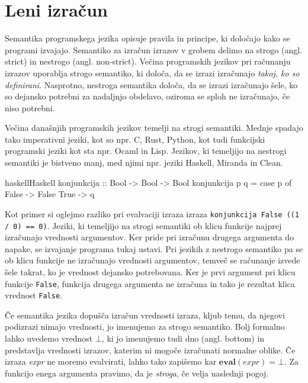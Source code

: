 \section{Leni izračun}
\label{sec:leni-izracun}

Semantika programskega jezika opisuje pravila in principe, ki določajo kako se programi izvajajo. Semantiko za izračun izrazov v grobem delimo na strogo (angl. strict) in nestrogo (angl. non-strict). Večina programskih jezikov pri računanju izrazov uporablja strogo semantiko, ki določa, da se izrazi izračunajo \textit{takoj, ko so definirani}. Nasprotno, nestroga semantika določa, da se izrazi izračunajo šele, ko so dejansko potrebni za nadaljnjo obdelavo, oziroma se sploh ne izračunajo, če niso potrebni.

Večina današnjih programskih jezikov temelji na strogi semantiki. Mednje spadajo tako imperativni jeziki, kot so npr. C, Rust, Python, kot tudi funkcijski programski jeziki kot sta npr. Ocaml in Lisp. Jezikov, ki temeljijo na nestrogi semantiki je bistveno manj, med njimi npr. jeziki Haskell, Miranda in Clean.

\begin{code-box}{haskell}{Haskell}
konjunkcija :: Bool -> Bool -> Bool
konjunkcija p q =
	case p of
		False -> False
		True -> q
\end{code-box}

Kot primer si oglejmo razliko pri evalvaciji izraza izraza \texttt{konjunkcija False ((1 / 0) == 0)}. Jeziki, ki temeljijo na strogi semantiki ob klicu funkcije najprej izračunajo vrednosti argumentov. Ker pride pri izračunu drugega argumenta do napake, se izvajanje programa tukaj ustavi. Pri jezikih z nestrogo semantiko pa se ob klicu funkcije ne izračunajo vrednosti argumentov, temveč se računanje izvede šele takrat, ko je vrednost dejansko potrebovana. Ker je prvi argument pri klicu funkcije \texttt{False}, funkcija drugega argumenta ne izračuna in tako je rezultat klica vrednost \texttt{False}.

Če semantika jezika dopušča izračun vrednosti izraza, kljub temu, da njegovi podizrazi nimajo vrednosti, jo imenujemo za strogo semantiko. Bolj formalno lahko uvedemo vrednost $\bot$, ki jo imenujemo tudi dno (angl. bottom) in predstavlja vrednosti izrazov, katerim ni mogoče izračunati normalne oblike. Če izraza \textit{expr} ne moremo evalvirati, lahko tako zapišemo kar $\textbf{eval}(expr) = \bot$. Za funkcijo enega argumenta pravimo, da je \textit{stroga}, če velja naslednji pogoj.

